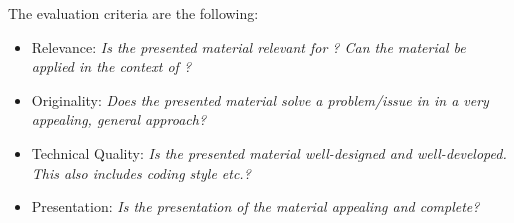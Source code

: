 The evaluation criteria are the following:

\begin{itemize}
	\item Relevance: \emph{Is the presented material relevant for \RCAW? Can the material be applied in the context of \RCAW?}
	\item Originality: \emph{Does the presented material solve a problem/issue in \RCAW in a very appealing, general approach?} 
	\item Technical Quality: \emph{Is the presented material well-designed and well-developed. This also includes coding style etc.? }
	\item Presentation: \emph{Is the presentation of the material appealing and complete?}
\end{itemize}

